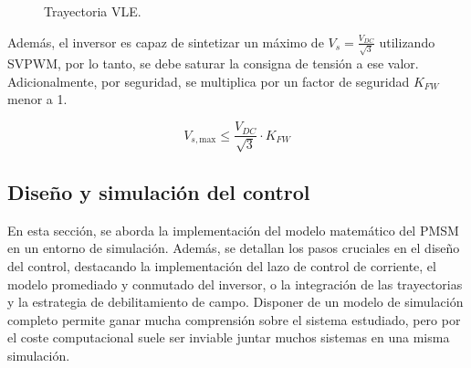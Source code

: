 \begin{figure}[H]
  \centering
  \caption{Trayectoria VLE.}
\end{figure}



Además, el inversor es capaz de sintetizar un máximo de $V_s = \frac{V_{DC}}{\sqrt{3}}$ utilizando SVPWM, por lo tanto, se debe saturar la consigna de tensión a ese valor. Adicionalmente, por seguridad, se multiplica por un factor de seguridad $K_{FW}$ menor a 1.

\begin{equation}
	V_{s,\text{max}} \leq \frac{V_{DC}}{\sqrt{3}}\cdot K_{FW}
\end{equation}

\subsection{Diseño y simulación del control}

En esta sección, se aborda la implementación del modelo matemático del PMSM en un entorno de simulación. Además, se detallan los pasos cruciales en el diseño del control, destacando la implementación del lazo de control de corriente, el modelo promediado y conmutado del inversor, o la integración de las trayectorias y la estrategia de debilitamiento de campo. Disponer de un modelo de simulación completo permite ganar mucha comprensión sobre el sistema estudiado, pero por el coste computacional suele ser inviable juntar muchos sistemas en una misma simulación.


